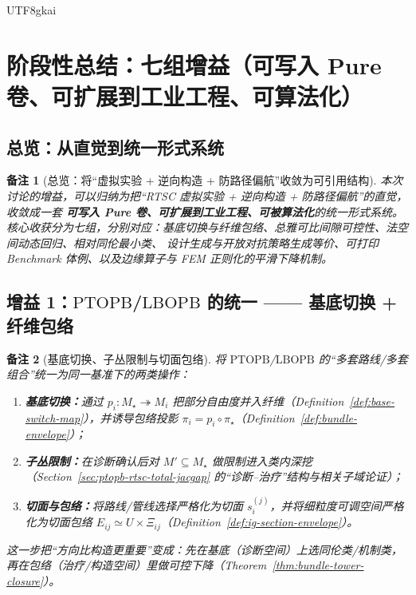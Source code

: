 \documentclass[12pt]{article}
\newtheorem{remark}{备注}[section]
\newcommand{\LBOPB}{\ensuremath{\mathrm{LBOPB}}}
\newcommand{\PTOPB}{\ensuremath{\mathrm{PTOPB}}}
\newcommand{\RTSC}{\textsf{RTSC}}
\begin{document}
\begin{CJK*}{UTF8}{gkai}
\section{阶段性总结：七组增益（可写入 Pure 卷、可扩展到工业工程、可算法化）}
\label{sec:discussion-gains-summary}

\subsection{总览：从直觉到统一形式系统}

\begin{remark}[总览：将“虚拟实验 + 逆向构造 + 防路径偏航”收敛为可引用结构]
本次讨论的增益，可以归纳为把“\RTSC{} 虚拟实验 + 逆向构造 + 防路径偏航”的直觉，收敛成一套
\textbf{可写入 Pure 卷、可扩展到工业工程、可被算法化}的统一形式系统。
核心收获分为七组，分别对应：基底切换与纤维包络、总雅可比间隙可控性、法空间动态回归、相对同伦最小类、
设计生成与开放对抗策略生成等价、可打印 Benchmark 体例、以及边缘算子与 FEM 正则化的平滑下降机制。
\end{remark}

\subsection{增益 1：\PTOPB{}/\LBOPB{} 的统一 —— 基底切换 + 纤维包络}

\begin{remark}[基底切换、子丛限制与切面包络]
将 \PTOPB{}/\LBOPB{} 的“多套路线/多套组合”统一为同一基准下的两类操作：
\begin{enumerate}
  \item \textbf{基底切换：}通过 $p_i:M_\star\twoheadrightarrow M_i$ 把部分自由度并入纤维（Definition~\ref{def:base-switch-map}），并诱导包络投影
    $\pi_i=p_i\circ\pi_\star$（Definition~\ref{def:bundle-envelope}）；
  \item \textbf{子丛限制：}在诊断确认后对 $M'\subseteq M_\star$ 做限制进入类内深挖（Section~\ref{sec:ptopb-rtsc-total-jacgap}
    的“诊断--治疗”结构与相关子域论证）；
  \item \textbf{切面与包络：}将路线/管线选择严格化为切面 $s_i^{(j)}$，并将细粒度可调空间严格化为切面包络 $E_{ij}\simeq U\times\Xi_{ij}$（Definition~\ref{def:ig-section-envelope}）。
\end{enumerate}
这一步把“方向比构造更重要”变成：先在基底（诊断空间）上选同伦类/机制类，再在包络（治疗/构造空间）里做可控下降（Theorem~\ref{thm:bundle-tower-closure}）。
\end{remark}


\end{CJK*}
\end{document}
